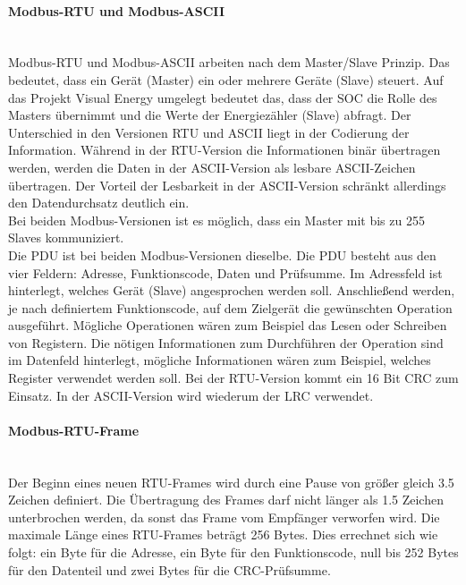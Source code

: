 \documentclass[../Bachelorarbeit.tex]{subfiles}
\begin{document}
\paragraph{Modbus-\acs{RTU} und Modbus-\acs{ASCII}}\mbox{}\\
Modbus-\acs{RTU} und Modbus-\acs{ASCII} arbeiten nach dem Master/Slave Prinzip. Das bedeutet, dass ein Gerät (Master) ein oder mehrere Geräte (Slave) steuert. Auf das Projekt Visual Energy 
umgelegt bedeutet das, dass der \ac{SOC} die Rolle des Masters übernimmt und die Werte der
Energiezähler (Slave) abfragt. Der Unterschied in den Versionen RTU und ASCII liegt in der Codierung der Information. Während in der RTU-Version die Informationen binär übertragen werden, werden die Daten in der ASCII-Version als lesbare ASCII-Zeichen übertragen. Der Vorteil der Lesbarkeit in der ASCII-Version schränkt allerdings den Datendurchsatz deutlich ein. \\
Bei beiden Modbus-Versionen ist es möglich, dass ein Master mit bis zu 255 Slaves 
kommuniziert.
\parencite[vgl.][S. 208]{bussyteme}\\
Die \ac{PDU} ist bei beiden Modbus-Versionen dieselbe. Die \ac{PDU} besteht 
aus den vier Feldern: Adresse, Funktionscode, Daten und Prüfsumme. Im Adressfeld ist 
hinterlegt, welches Gerät (Slave) angesprochen werden soll. Anschließend werden, je 
nach definiertem Funktionscode, auf dem Zielgerät die gewünschten Operation 
ausgeführt. Mögliche Operationen wären zum Beispiel das Lesen oder Schreiben von 
Registern. Die nötigen Informationen zum Durchführen der Operation sind im Datenfeld 
hinterlegt, mögliche Informationen wären zum Beispiel, welches Register verwendet 
werden soll. Bei der RTU-Version kommt ein 16 Bit \ac{CRC} zum Einsatz. In der ASCII-Version wird wiederum der \ac{LRC} verwendet. 
\parencite[vgl.][S. 78 ff]{modbus_dipl_arbeit}

\paragraph{Modbus-\acs{RTU}-Frame}\mbox{}\\
\label{para:modbus_rtu}
Der Beginn eines neuen \acs{RTU}-Frames wird durch eine Pause von größer gleich 3.5 
Zeichen definiert. Die Übertragung des Frames darf nicht länger als 1.5 Zeichen 
unterbrochen werden, da sonst das Frame vom Empfänger verworfen wird. Die maximale 
Länge eines \acs{RTU}-Frames beträgt 256 Bytes. Dies errechnet sich wie folgt: ein Byte für die 
Adresse, ein Byte für den Funktionscode, null bis 252 Bytes für den Datenteil und zwei 
Bytes für die \acs{CRC}-Prüfsumme. 
\parencite[vgl.][S. 79]{modbus_dipl_arbeit}
\end{document}
